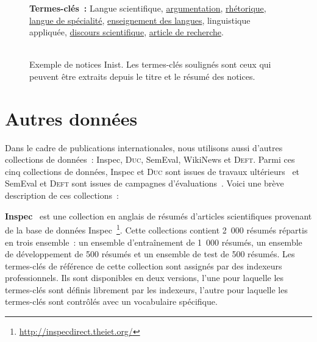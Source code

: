 \begin{figure}
{{          \textbf{Termes-clés~:} Langue scientifique,
          \underline{argumentation},  \underline{rhétorique},  \underline{langue
          de spécialité}, \underline{enseignement des langues}, linguistique
          appliquée,  \underline{discours scientifique},  \underline{article de
          recherche}. 
        }
      }
      ~\\~\\
      \caption{Exemple de notices Inist. Les termes-clés soulignés sont ceux qui
               peuvent être extraits depuis le titre et le résumé des notices.
               \label{fig:exemple_notice_inist}}
    \end{figure}

  \section{Autres données}
    Dans le cadre de publications internationales, nous utilisons aussi d'autres
    collections de données~: Inspec, \textsc{Duc}, SemEval, WikiNews et
    \textsc{Deft}. Parmi ces cinq collections de données, Inspec et
    \textsc{Duc} sont issues de travaux
    ultérieurs~\citep{hulth2003keywordextraction,wan2008expandrank} et SemEval
    et \textsc{Deft} sont issues de campagnes
    d'évaluations~\citep{kim2010semeval,paroubek2012deft}. Voici une brève
    description de ces collections~:

    \textbf{Inspec}~\citep{hulth2003keywordextraction} est une collection en
    anglais de résumés d'articles scientifiques provenant de la base de données
    Inspec~\footnote{\url{http://inspecdirect.theiet.org/}}. Cette collections
    contient 2~000 résumés répartis en trois ensemble~: un ensemble
    d'entraînement de 1~000 résumés, un ensemble de développement de 500 résumés
    et un ensemble de test de 500 résumés. Les termes-clés de référence de cette
    collection sont assignés par des indexeurs professionnels. Ils sont
    disponibles en deux versions, l'une pour laquelle les termes-clés sont
    définis librement par les indexeurs, l'autre pour laquelle les termes-clés
    sont contrôlés avec un vocabulaire spécifique.

